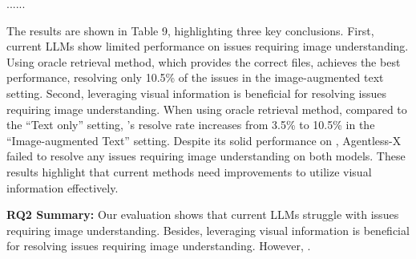 \documentclass[12pt,american]{article}
\begin{document}
\begin{revresponse}
\begin{enumerate}
\begin{changes}
......

 The results are shown in Table 9, highlighting three key conclusions. First, current LLMs show limited performance on issues requiring image understanding. Using oracle retrieval method, which provides the correct files, \Claude achieves the best performance, resolving only 10.5\% of the issues in the image-augmented text setting. 
 Second, leveraging visual information is beneficial for resolving issues requiring image understanding. When using oracle retrieval method, compared to the ``Text only'' setting, \Claude's resolve rate increases from 3.5\% to 10.5\% in the ``Image-augmented Text'' setting.    Despite its solid performance on \Swebenchx, Agentless-X failed to resolve any issues requiring image understanding on both models.  These results highlight  that current methods need improvements to utilize visual information effectively.

\begin{center}
    \begin{myboxc} \textbf{RQ2 Summary: } %
     Our evaluation shows that current LLMs struggle with issues requiring image understanding. Besides,  leveraging visual information is beneficial for resolving issues requiring image understanding. However, .
    \end{myboxc} %
\end{center}

\end{changes}



\end{enumerate}
\end{revresponse}
\end{document}
